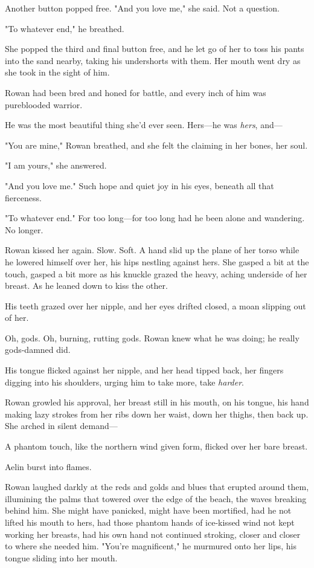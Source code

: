 Another button popped free. "And you love me," she said. Not a question.

"To whatever end," he breathed.

She popped the third and final button free, and he let go of her to toss his pants into the sand nearby, taking his undershorts with them. Her mouth went dry as she took in the sight of him.

Rowan had been bred and honed for battle, and every inch of him was pureblooded warrior.

He was the most beautiful thing she'd ever seen. Hers---he was
\emph{hers}, and---

"You are mine," Rowan breathed, and she felt the claiming in her bones, her soul.

"I am yours," she answered.

"And you love me." Such hope and quiet joy in his eyes, beneath all that fierceness.

"To whatever end." For too long---for too long had he been alone and wandering. No longer.

Rowan kissed her again. Slow. Soft. A hand slid up the plane of her torso while he lowered himself over her, his hips nestling against hers. She gasped a bit at the touch, gasped a bit more as his knuckle grazed the heavy, aching underside of her breast. As he leaned down to kiss the other.

His teeth grazed over her nipple, and her eyes drifted closed, a moan slipping out of her.

Oh, gods. Oh, burning, rutting gods. Rowan knew what he was doing; he really gods-damned did.

His tongue flicked against her nipple, and her head tipped back, her fingers digging into his shoulders, urging him to take more, take
\emph{harder}.

Rowan growled his approval, her breast still in his mouth, on his tongue, his hand making lazy strokes from her ribs down her waist, down her thighs, then back up. She arched in silent demand---

A phantom touch, like the northern wind given form, flicked over her bare breast.

Aelin burst into flames.

Rowan laughed darkly at the reds and golds and blues that erupted around them, illumining the palms that towered over the edge of the beach, the waves breaking behind him. She might have panicked, might have been mortified, had he not lifted his mouth to hers, had those phantom hands of ice-kissed wind not kept working her breasts, had his own hand not continued stroking, closer and closer to where she needed him. "You're magnificent," he murmured onto her lips, his tongue sliding into her mouth.

